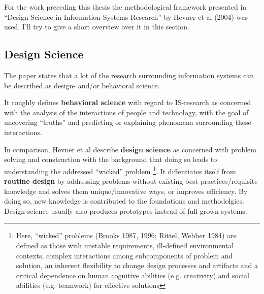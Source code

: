 For the work preceding this thesis the methodological
framework presented in ``Design Science in Information
Systems Research'' by Hevner et al (2004) was used.
I'll try to give a short overview over it in this section.

\subsection{Design Science}

The paper states that a lot of the research surrounding information systems can be described as design- and/or behavioral science.

It roughly defines \textbf{behavioral science} with regard to IS-research as concerned with the analysis of the interactions of people and technology, with the goal of uncovering ``truths'' and predicting or explaining phenomena surrounding these interactions.

In comparison, Hevner et al describe \textbf{design science} as concerned with problem solving and construction with the background that doing so leads to understanding the addressed ``wicked'' problem \footnote{\label{ref:wicked}Here, ``wicked'' problems (Brooks 1987, 1996; Rittel, Webber 1984) are defined as those with unstable requirements, ill-defined environmental contexts, complex interactions among subcomponents of problem and solution, an inherent flexibility to change design processes and artifacts and a critical dependence on human cognitive abilities (e.g. creativity) and social abilities (e.g. teamwork) for effective solutions}. It diffentiates itself from \textbf{routine design} by addressing problems without existing best-practices/requisite knowledge and solves them unique/innovative ways, or improves efficiency. By doing so, new knowledge is contributed to the foundations and methodolgies. Design-science usually also produces prototypes instead of full-grown systems.





